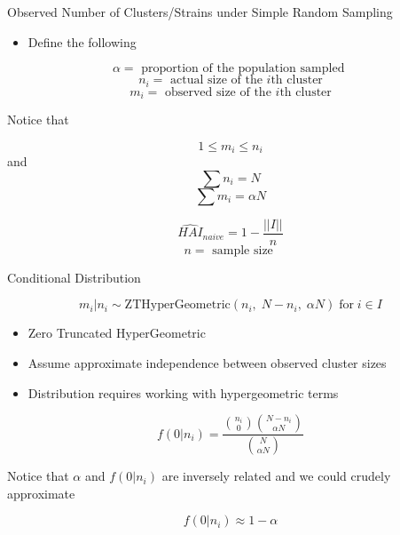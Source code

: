 \documentclass[ignorenonframetext,]{beamer}
\providecommand{\tightlist}{%
  \setlength{\itemsep}{0pt}\setlength{\parskip}{0pt}}
\begin{document}
\begin{frame}{Observed Number of Clusters/Strains under Simple Random
Sampling}
\protect\hypertarget{observed-number-of-clustersstrains-under-simple-random-sampling}{}

\begin{itemize}
\tightlist
\item
  Define the following
\end{itemize}

\[\alpha = \textrm{ proportion of the population sampled }\]
\[ n_i = \textrm{ actual size of the }i \textrm{th cluster}\]
\[ m_i = \textrm{ observed size of the }i \textrm{th cluster}\]

Notice that

\[1 \le m_i \le n_i\] and \[\sum n_i = N\] \[ \sum m_i = \alpha N\]

\[ \widehat{HAI}_{naive} = 1 - \frac{||I||}{n} \]
\[ n = \textrm{ sample size } \]

\end{frame}

\begin{frame}{Conditional Distribution}
\protect\hypertarget{conditional-distribution}{}

\[m_i | n_i \sim \textrm{ZTHyperGeometric}(n_i, \; N-n_i, \;\alpha N) \; \textrm{for}\; i \in I\]

\begin{itemize}
\tightlist
\item
  Zero Truncated HyperGeometric
\item
  Assume approximate independence between observed cluster sizes
\item
  Distribution requires working with hypergeometric terms
\end{itemize}

\[f(0|n_i) =  \frac{ {n_i \choose 0}{N-n_i \choose \alpha N} }{ {N \choose \alpha N}}\]

Notice that \(\alpha\) and \(f(0|n_i)\) are inversely related and we
could crudely approximate

\[f(0|n_i) \approx 1-\alpha\]

\end{frame}
\end{document}
